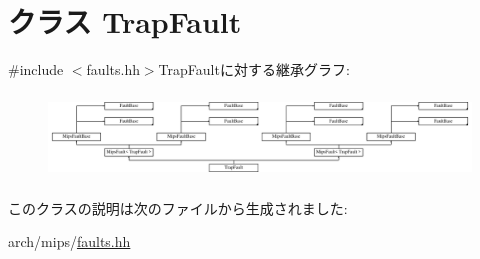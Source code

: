 \hypertarget{classMipsISA_1_1TrapFault}{
\section{クラス TrapFault}
\label{classMipsISA_1_1TrapFault}
}


{\ttfamily \#include $<$faults.hh$>$}TrapFaultに対する継承グラフ:\begin{figure}[H]
\begin{center}
\leavevmode
\includegraphics[height=2.28758cm]{classMipsISA_1_1TrapFault}
\end{center}
\end{figure}


このクラスの説明は次のファイルから生成されました:\begin{DoxyCompactItemize}
\item 
arch/mips/\hyperlink{arch_2mips_2faults_8hh}{faults.hh}\end{DoxyCompactItemize}
